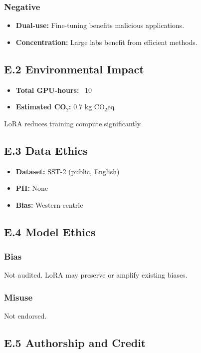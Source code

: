 \subsubsection{Negative}
\begin{itemize}
\item \textbf{Dual-use:} Fine-tuning benefits malicious applications.
\item \textbf{Concentration:} Large labs benefit from efficient methods.

\end{itemize}
\subsection{E.2 Environmental Impact}

\begin{itemize}
\item \textbf{Total GPU-hours:} ~10
\item \textbf{Estimated CO$_2$:} 0.7 kg CO$_2$eq

\end{itemize}
LoRA reduces training compute significantly.

\subsection{E.3 Data Ethics}

\begin{itemize}
\item \textbf{Dataset:} SST-2 (public, English)
\item \textbf{PII:} None
\item \textbf{Bias:} Western-centric

\end{itemize}
\subsection{E.4 Model Ethics}

\subsubsection{Bias}
Not audited. LoRA may preserve or amplify existing biases.

\subsubsection{Misuse}
Not endorsed.

\subsection{E.5 Authorship and Credit}

